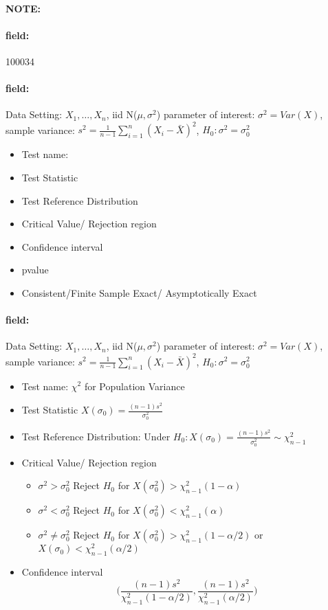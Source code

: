 \documentclass[12pt]{article}
\newenvironment{note}{\paragraph{NOTE:}}{}
\newenvironment{field}{\paragraph{field:}}{}
\begin{document}
\begin{note} \begin{field} \tiny 100034 \end{field}
 \begin{field}
  Data Setting: $X_1, \ldots, X_n$, iid N($\mu,\sigma^2$) parameter of interest: $\sigma^2 = Var(X)$, sample variance: $s^2 = \frac{1}{n-1} \sum_{i=1}^n(X_i - \bar{X})^2$, $H_0: \sigma^2 = \sigma_0^2$
  \begin{itemize}
   \item Test name:
   \item Test Statistic
   \item Test Reference Distribution
   \item Critical Value/ Rejection region
   \item Confidence interval
   \item pvalue
   \item Consistent/Finite Sample Exact/ Asymptotically Exact
  \end{itemize}
 \end{field}
 \begin{field}
  Data Setting: $X_1, \ldots, X_n$, iid N($\mu,\sigma^2$) parameter of interest: $\sigma^2 = Var(X)$, sample variance: $s^2 = \frac{1}{n-1} \sum_{i=1}^n(X_i - \bar{X})^2$, $H_0: \sigma^2 = \sigma_0^2$
  \begin{itemize}
   \item Test name: $\chi^2$ for Population Variance
   \item Test Statistic $X(\sigma_0) = \frac{(n-1)s^2}{\sigma_0^2}$
   \item Test Reference Distribution: Under $H_0: X(\sigma_0) = \frac{(n-1)s^2}{\sigma_0^2} \sim \chi_{n-1}^2$
   \item Critical Value/ Rejection region
         \begin{itemize}
          \item  $\sigma^2 > \sigma_0^2$ Reject $H_0$ for $X(\sigma_0^2) > \chi^2_{n-1}(1-\alpha)$
          \item $\sigma^2 < \sigma_0^2$ Reject $H_0$ for $X(\sigma_0^2) < \chi^2_{n-1}(\alpha)$
          \item $\sigma^2 \neq \sigma_0^2$ Reject $H_0$ for $X(\sigma_0^2) > \chi^2_{n-1}(1 - \alpha/2)$ or $X(\sigma_0) < \chi^2_{n-1}(\alpha/2)$
         \end{itemize}
   \item Confidence interval  $$ \bigg( \frac{(n-1)s^2}{\chi^2_{n-1}(1 - \alpha/2)}, \frac{(n-1)s^2}{\chi^2_{n-1}(\alpha/2)}\bigg)$$

\end{itemize}
\end{field}
\end{note}
\end{document}
